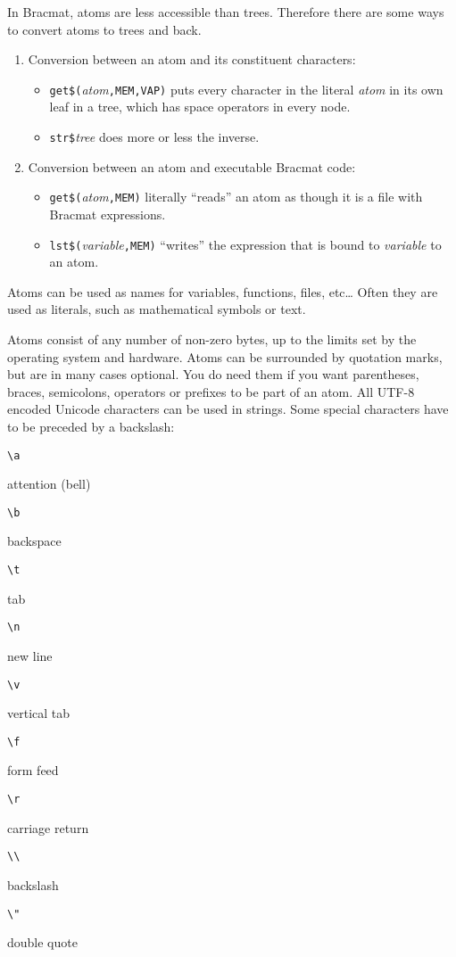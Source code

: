 \documentclass[12pt]{article}
\begin{document}
In Bracmat, atoms are less accessible than trees. Therefore there are
some ways to convert atoms to trees and back.
\begin{enumerate}
\item Conversion between an atom and its constituent characters:
  \begin{itemize}
  \item
    \verb|get$(|\emph{atom}\verb|,MEM,VAP)| puts every character in
    the literal \emph{atom} in its own leaf in a tree, which has space
    operators in every node.
  \item \verb|str$|\emph{tree} does more or less the inverse.
  \end{itemize}
\item Conversion between an atom and executable Bracmat code:
  \begin{itemize}
  \item
    \verb|get$(|\emph{atom}\verb|,MEM)| literally ``reads'' an atom as
    though it is a file with Bracmat expressions.
  \item \verb|lst$(|\emph{variable}\verb|,MEM)| ``writes'' the
    expression that is bound to \emph{variable} to an atom.
  \end{itemize}
\end{enumerate}

Atoms can be used as names for variables, functions, files, etc\ldots
Often they are used as literals, such as mathematical symbols or text.

Atoms consist of any number of non-zero bytes, up to the limits set by
the operating system and hardware. Atoms can be surrounded by
quotation marks, but are in many cases optional. You do need them if
you want parentheses, braces, semicolons, operators or prefixes to be
part of an atom. All UTF-8 encoded Unicode characters can be used in
strings. Some special characters have to be preceded by a backslash:
\begin{description}
\item  \verb|\a|\par
  attention (bell)
\item \verb|\b|\par
  backspace
\item \verb|\t|\par
  tab
\item \verb|\n|\par
  new line
\item \verb|\v|\par
  vertical tab
\item \verb|\f|\par
  form feed
\item \verb|\r|\par
  carriage return
\item \verb|\\|\par
  backslash
\item \verb|\"|\par
  double quote
\end{description}
\end{document}
